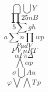 \begin{equation}  \bigcap \bigcup Y \end{equation}
\begin{equation} \prod 25nB \end{equation}
\begin{equation} 5 \sum gh \end{equation}
\begin{equation} a \sum n \prod wp \end{equation}
\begin{equation} PadV \end{equation}
\begin{equation} P \, V \; nRT \end{equation}
\begin{equation}  \alpha \Gamma \pi \Delta \end{equation}
\begin{equation}  \bigwedge \alpha p \end{equation}
\begin{equation}  \sigma \bigcup Au \end{equation}
\begin{equation}  \varphi \bigvee \bigwedge T \, p \end{equation}